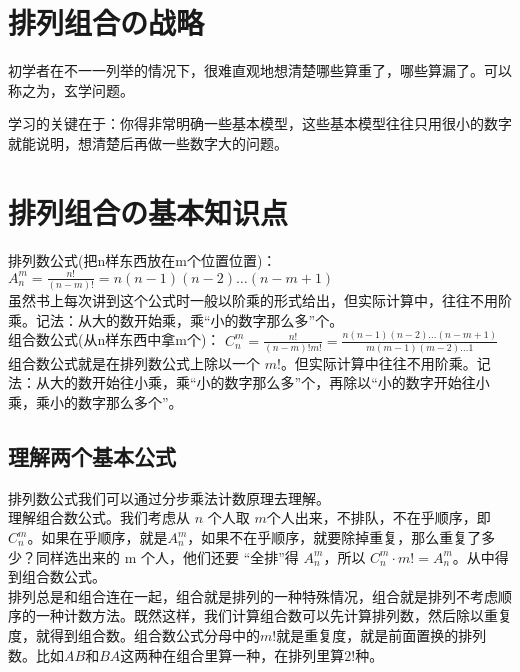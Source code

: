\section{排列组合の战略}
    初学者在不一一列举的情况下，很难直观地想清楚哪些算重了，哪些算漏了。可以称之为，玄学问题。

    学习的关键在于：你得非常明确一些基本模型，这些基本模型往往只用很小的数字就能说明，想清楚后再做一些数字大的问题。

\section{排列组合の基本知识点}
    排列数公式(把n样东西放在m个位置位置)： $A_n^m = \frac{n!}{(n-m)!}=n(n-1)(n-2)\ldots (n-m+1)$
    \\

    虽然书上每次讲到这个公式时一般以阶乘的形式给出，但实际计算中，往往不用阶乘。记法：从大的数开始乘，乘“小的数字那么多”个。
    \\

    组合数公式(从n样东西中拿m个)： $C_n^m = \frac{n!}{(n-m)!m!} = \frac{n(n-1)(n-2) \ldots (n-m+1)}{m(m-1)(m-2) \ldots 1}$
    \\

    组合数公式就是在排列数公式上除以一个 $m!$。但实际计算中往往不用阶乘。记法：从大的数开始往小乘，乘“小的数字那么多”个，再除以“小的数字开始往小乘，乘小的数字那么多个”。

    \subsection{理解两个基本公式}
    排列数公式我们可以通过分步乘法计数原理去理解。
    \\

    理解组合数公式。我们考虑从 $n$ 个人取 $m$个人出来，不排队，不在乎顺序，即 $C_n^m$。如果在乎顺序，就是$A_n^m$，如果不在乎顺序，就要除掉重复，那么重复了多少？同样选出来的 m 个人，他们还要 “全排”得 $A_n^m$，所以 $C_n^m \cdot m! = A_n^m$。从中得到组合数公式。
    \\

    排列总是和组合连在一起，组合就是排列的一种特殊情况，组合就是排列不考虑顺序的一种计数方法。既然这样，我们计算组合数可以先计算排列数，然后除以重复度，就得到组合数。组合数公式分母中的$m!$就是重复度，就是前面置换的排列数。比如$AB$和$BA$这两种在组合里算一种，在排列里算$2!$种。

